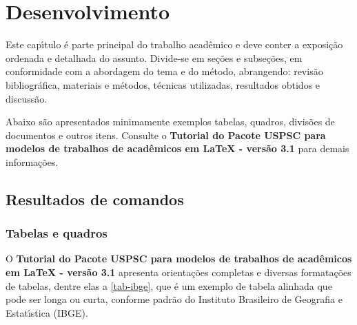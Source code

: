 

\chapter{Desenvolvimento}\label{cap_exemplos}
Este cap\'{\i}tulo \'e parte principal do trabalho acad\^emico e deve conter a exposi\c{c}\~ao ordenada e detalhada do assunto. Divide-se em se\c{c}\~oes e subse\c{c}\~oes, em conformidade com a abordagem do tema e do m\'etodo, abrangendo: revis\~ao bibliogr\'afica, materiais e m\'etodos, t\'ecnicas utilizadas, resultados obtidos e discuss\~ao.

Abaixo s\~ao apresentados minimamente exemplos tabelas, quadros, divis\~oes de documentos e outros itens. Consulte o \textbf{Tutorial do Pacote USPSC para modelos de trabalhos de acad\^emicos em LaTeX - vers\~ao 3.1} para demais informa\c{c}\~oes. 

\section{Resultados de comandos}\label{sec-divisoes}

\subsection{Tabelas e quadros}

O \textbf{Tutorial do Pacote USPSC para modelos de trabalhos de acad\^emicos em LaTeX - vers\~ao 3.1} apresenta orienta\c{c}\~oes completas e diversas formata\c{c}\~oes de tabelas, dentre elas a \autoref{tab-ibge}, que \'e um exemplo de tabela alinhada que pode ser longa ou curta, conforme padr\~ao do Instituto Brasileiro de Geografia e Estat\'{\i}stica (IBGE).

\begin{table}[Htb]
\end{table}


